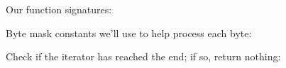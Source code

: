 \documentclass[../index.tex]{subfiles}
\begin{document}
%
%
%
%
%
%
%
%
%
\begin{frame}{\currenttitle}
  Our function signatures: \\[1em]
\end{frame}

\begin{frame}{\currenttitle}
  Byte mask constants we'll use to help process each byte: \\[1em]
\end{frame}

\newcommand{\decodercodelisting}[2]{%
}
\begin{frame}{\currenttitle}
%
  Check if the iterator has reached the end; if so, return nothing: \\[1em]
  \decodercodelisting{8}{13}
\end{frame}
\end{document}
